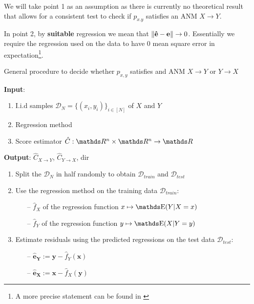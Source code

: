 We will take point 1 as an assumption as there is currently no theoretical result that allows for a consistent 
test to check if $p_{x. y}$ satisfies an ANM $X \rightarrow Y$. 

In point 2, by \textbf{suitable} regression we mean that $\left\lVert\mathbf{\hat{e}} - \mathbf{e}\right\rVert \rightarrow 0$.
Essentially we require the regression used on the data to have 0 mean square error in expectation\footnote{A 
more precise statement can be found in \cite{Mooij2016jmlr}}. 

\begin{algorithm}[H]%

    \caption{General procedure to decide whether $p_{x, y}$ satisfies and ANM $X \rightarrow Y$
        or $Y \rightarrow X$}
  
    \textbf{Input}:

    \begin{enumerate}
        \item I.i.d samples $\mathcal{D}_N = \{ (x_i, y_i )\}_{i \in [N]}$ of $X$ and $Y$
        \item Regression method
        \item Score estimator $\hat{C}: \R^n \times \R^n \rightarrow \R$
    \end{enumerate}
    
    \textbf{Output}: $\hat{C}_{X \rightarrow Y}$, $\hat{C}_{Y \rightarrow X}$, dir

    \begin{enumerate}

        \item Split the $\mathcal{D}_N$ in half randomly to obtain  $\mathcal{D}_{train}$ 
        and $\mathcal{D}_{test}$

        \item Use the regression method on the training data $\mathcal{D}_{train}$:
        \begin{itemize}
            \item[--] $\hat{f}_X$ of the regression function $x \mapsto \E(Y | X=x)$
            \item[--] $\hat{f}_Y$ of the regression function $y \mapsto \E(X | Y=y)$
        \end{itemize}

        \item Estimate residuals using the predicted regressions on the test data $\mathcal{D}_{test}$:
        \begin{itemize}
            \item[--] $ \mathbf{\hat{e}_Y} := \mathbf{y} - \hat{f}_Y(\mathbf{x})$
            \item[--] $ \mathbf{\hat{e}_X} := \mathbf{x} - \hat{f}_X(\mathbf{y})$
        \end{itemize}


\end{enumerate}
\end{algorithm}
